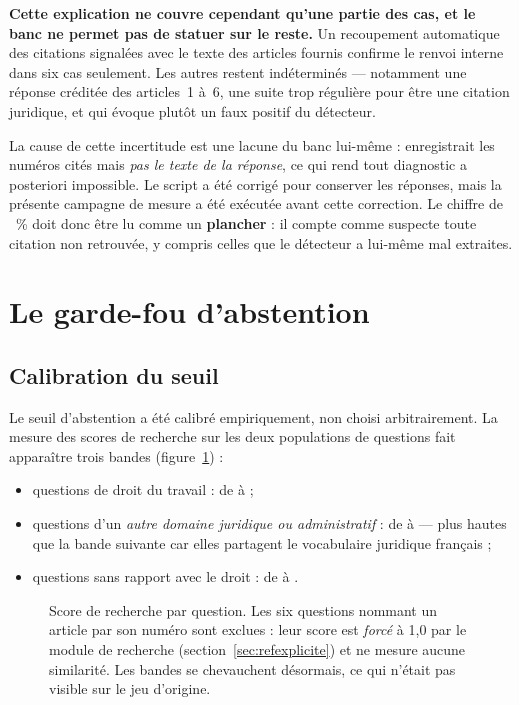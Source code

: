 \begin{limite}
\textbf{Cette explication ne couvre cependant qu'une partie des cas, et le banc ne permet pas de
statuer sur le reste.} Un recoupement automatique des \NbNonVerifiees{} citations signalées avec
le texte des articles fournis confirme le renvoi interne dans six cas seulement. Les autres restent
indéterminés --- notamment une réponse créditée des articles~1 à~6, une suite trop régulière pour
être une citation juridique, et qui évoque plutôt un faux positif du détecteur.

\smallskip
La cause de cette incertitude est une lacune du banc lui-même : 
enregistrait les numéros cités mais \emph{pas le texte de la réponse}, ce qui rend tout diagnostic
a posteriori impossible. Le script a été corrigé pour conserver les réponses, mais la présente
campagne de mesure a été exécutée avant cette correction. Le chiffre de \TauxVerif~\% doit donc
être lu comme un \textbf{plancher} : il compte comme suspecte toute citation non retrouvée, y
compris celles que le détecteur a lui-même mal extraites.
\end{limite}

\section{Le garde-fou d'abstention}

\subsection{Calibration du seuil}

Le seuil d'abstention a été calibré empiriquement, non choisi arbitrairement. La mesure des scores
de recherche sur les deux populations de questions fait apparaître trois bandes
(figure~\ref{fig:seuil}) :

\begin{itemize}
  \item questions de droit du travail : de \ScoreInMin{} à \ScoreInMax{} ;
  \item questions d'un \emph{autre domaine juridique ou administratif} : de
        \ScoreJuridiqueMin{} à \ScoreJuridiqueMax{} --- plus hautes que la bande suivante car
        elles partagent le vocabulaire juridique français ;
  \item questions sans rapport avec le droit : de \ScoreHorsDroitMin{} à \ScoreHorsDroitMax{}.
\end{itemize}

\begin{figure}[htbp]
  \centering
  
  \caption[Séparation des scores de recherche]{Score de recherche par question. Les six questions
  nommant un article par son numéro sont exclues : leur score est \emph{forcé} à 1,0 par le module
  de recherche (section~\ref{sec:refexplicite}) et ne mesure aucune similarité. Les bandes se
  chevauchent désormais, ce qui n'était pas visible sur le jeu d'origine.}
  \label{fig:seuil}
\end{figure}

